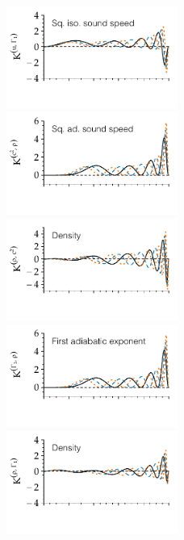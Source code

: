 {\begin{figure}
    \includegraphics[width=0.5\textwidth,trim={0 1.1cm 0 0}, clip]{figs/pulse/kernels/kernel-n-u_Gamma1-diffusion.pdf}\\
    \includegraphics[width=0.5\textwidth,trim={0 1.1cm 0 0}, clip]{figs/pulse/kernels/kernel-n-c2_rho-diffusion.pdf}%
    \includegraphics[width=0.5\textwidth,trim={0 1.1cm 0 0}, clip]{figs/pulse/kernels/kernel-n-rho_c2-diffusion.pdf}\\
    \includegraphics[width=0.5\textwidth,trim={0 1.1cm 0 0}, clip]{figs/pulse/kernels/kernel-n-Gamma1_rho-diffusion.pdf}%
    \includegraphics[width=0.5\textwidth,trim={0 1.1cm 0 0}, clip]{figs/pulse/kernels/kernel-n-rho_Gamma1-diffusion.pdf}\\

\end{figure}}
